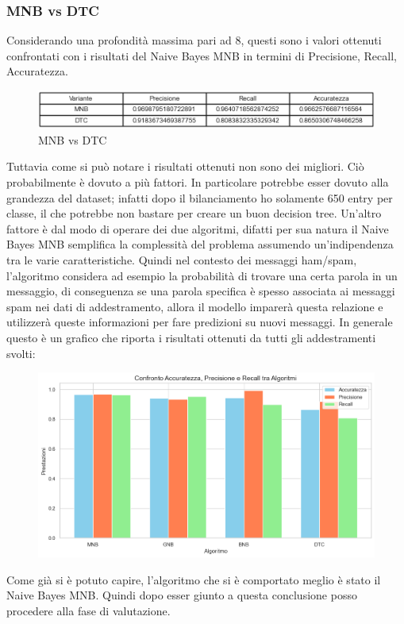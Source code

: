 \documentclass[]{article}
\begin{document}
                    \subsubsection{MNB vs DTC}
                        Considerando una profondità massima pari ad 8, questi sono i valori ottenuti confrontati con i risultati del Naive Bayes MNB in termini di Precisione, Recall, Accuratezza.

                        \begin{figure}[H]
                            \centering
                            \includegraphics[width=1\linewidth]{images/FinalTable.png}
                            \caption{MNB vs DTC}
                            \label{fig:enter-label}
                        \end{figure}

                        Tuttavia come si può notare i risultati ottenuti non sono dei migliori. Ciò probabilmente è dovuto a più fattori. In particolare potrebbe esser dovuto alla grandezza del dataset; infatti dopo il bilanciamento ho solamente 650 entry per classe, il che potrebbe non bastare per creare un buon decision tree. Un'altro fattore è dal modo di operare dei due algoritmi, difatti per sua natura il Naive Bayes MNB semplifica la complessità del problema assumendo un'indipendenza tra le varie caratteristiche. Quindi nel contesto dei messaggi ham/spam, l'algoritmo considera ad esempio la probabilità di trovare una certa parola in un messaggio, di conseguenza se una parola specifica è spesso associata ai messaggi spam nei dati di addestramento, allora il modello imparerà questa relazione e utilizzerà queste informazioni per fare predizioni su nuovi messaggi.
                        In generale questo è un grafico che riporta i risultati ottenuti da tutti gli addestramenti svolti:
                        \begin{figure}[H]
                            \centering
                            \includegraphics[width=1\linewidth]{images/AllResult.png}
                            \label{fig:enter-label}
                        \end{figure}
                        Come già si è potuto capire, l'algoritmo che si è comportato meglio è stato il Naive Bayes MNB. Quindi dopo esser giunto a questa conclusione posso procedere alla fase di valutazione.
\end{document}
